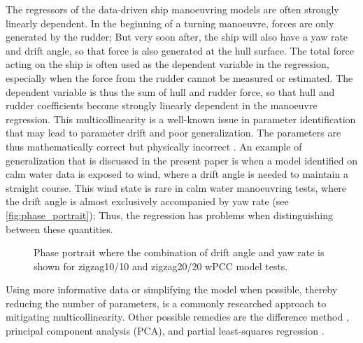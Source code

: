 %
The regressors of the data-driven ship manoeuvring models are often strongly linearly dependent. 
In the beginning of a turning manoeuvre, forces are only generated by the rudder; But very soon after, the ship will also have a yaw rate and drift angle, so that force is also generated at the hull surface. The total force acting on the ship is often used as the dependent variable in the regression, especially when the force from the rudder cannot be measured or estimated. The dependent variable is thus the sum of hull and rudder force, so that hull and rudder coefficients become strongly linearly dependent in the manoeuvre regression.
This multicollinearity is a well-known issue in parameter identification that may lead to parameter drift and poor generalization. The parameters are thus mathematically correct but physically incorrect \citep{luo_parameter_2016-1}. 
An example of generalization that is discussed in the present paper is when a model identified on calm water data is exposed to wind, where a drift angle is needed to maintain a straight course. This wind state is rare in calm water manoeuvring tests, where the drift angle is almost exclusively accompanied by yaw rate (see \autoref{fig:phase_portrait}); 
Thus, the regression has problems when distinguishing between these quantities.
%
\begin{figure}[h]
  \centering
  
  \caption{Phase portrait where the combination of drift angle and yaw rate is shown for zigzag10/10 and zigzag20/20 wPCC model tests.}
  \label{fig:phase_portrait}
\end{figure}
Using more informative data or simplifying the model when possible, thereby reducing the number of parameters, is a commonly researched approach to mitigating multicollinearity. Other possible remedies are the difference method \citep{luo_parameter_2016-1}, principal component analysis (PCA), and partial least-squares regression \citep{jian-chuan_parametric_2015}. 

